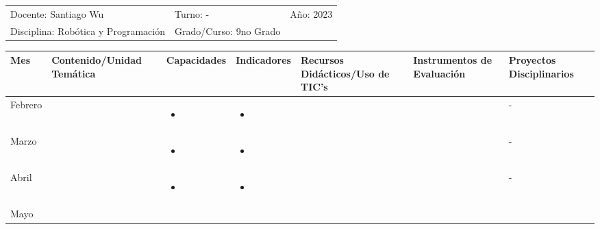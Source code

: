 \documentclass[landscape, a4paper, 10pt]{article}
\newcommand{\smallcellwidth}{0.7in}
\newcommand{\normalcellwidth}{1.2in}
\newcommand{\bigcellwidth}{2.0in}
\newcommand{\profesor}{Santiago Wu}
\newcommand{\discipline}{Robótica y Programación}
\newcommand{\currentyear}{2023}
\begin{document}
	\pagebreak[4]
	\begin{tabularx}{\textwidth}{ >{\raggedright\arraybackslash}X >{\raggedright\arraybackslash}X >{\raggedright\arraybackslash}X }
		Docente: \profesor &
		Turno: - &
		Año: \currentyear \\
		Disciplina: \discipline &
		Grado/Curso: 9no Grado &
		 \\
	\end{tabularx}
	\centering
	\begin{longtable}{|m{\smallcellwidth}|p{\normalcellwidth}|p{\bigcellwidth}|p{\bigcellwidth}|p{\normalcellwidth}|p{\normalcellwidth}|p{\normalcellwidth}|}
		\hline
		\textbf{Mes} &
		\textbf{Contenido/Unidad Temática} &
		\textbf{Capacidades} &
		\textbf{Indicadores} &
		\textbf{Recursos Didácticos/Uso de TIC's} &
		\textbf{Instrumentos de Evaluación} &
		\textbf{Proyectos Disciplinarios} \\
		\hline
		\endhead
		Febrero &
		 &
		\begin{itemize}
			\item 
		\end{itemize} &
		\begin{itemize}
			\item 
		\end{itemize} &
		  &
		  &
		 - \\
		\hline
		Marzo &
		 &
		\begin{itemize}
			\item 
		\end{itemize} &
		\begin{itemize}
			\item 
		\end{itemize} &
		  &
		  &
		 - \\
		\hline
		Abril &
		 &
		\begin{itemize}
			\item 
		\end{itemize} &
		\begin{itemize}
			\item 
		\end{itemize} &
		  &
		  &
		 - \\
		\hline
		Mayo &
		 &
		\begin{itemize}

\end{itemize}
\end{longtable}
\end{document}
